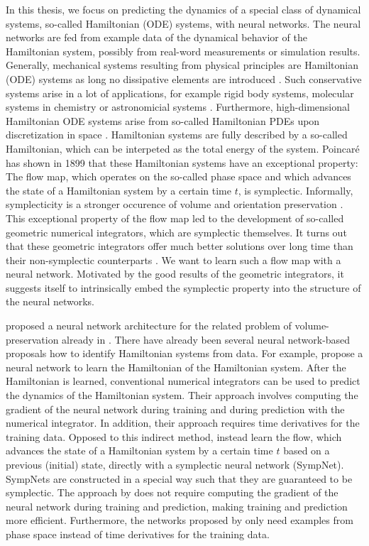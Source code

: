 \documentclass[twoside,a4paper]{article}
\begin{document}
In this thesis, we focus on predicting the dynamics of a special class of dynamical
systems, so-called Hamiltonian (ODE) systems, with neural networks. The neural networks
are fed from example data of the dynamical behavior of the Hamiltonian system,
possibly from real-word measurements or simulation results.
Generally, mechanical systems resulting from physical principles are
Hamiltonian (ODE) systems as long no dissipative elements are introduced 
\cite{leimkuhler_reich_2005}. Such conservative systems arise in a lot
of applications, for example rigid body systems, molecular systems in chemistry or
astronomicial systems \cite{leimkuhler_reich_2005}. Furthermore, high-dimensional
Hamiltonian ODE systems arise from so-called Hamiltonian PDEs upon discretization
in space \cite{leimkuhler_reich_2005}. Hamiltonian systems are fully described
by a so-called Hamiltonian, which can be interpeted as the total energy of the system.
Poincaré has shown in 1899 that these Hamiltonian
systems have an exceptional property: The flow map, which operates on the so-called phase space 
and which advances the state of a Hamiltonian system by a certain time $t$, is symplectic. 
Informally, symplecticity is a stronger occurence of volume and orientation preservation
\cite{leimkuhler_reich_2005}. This exceptional property of the flow map led to the development of 
so-called geometric numerical integrators, which are symplectic themselves. It turns out 
that these geometric integrators offer much better solutions over long time than their
non-symplectic counterparts \cite{hairer2006}. We want to learn such a flow map with 
a neural network. Motivated by the good results of the geometric integrators,
it suggests itself to intrinsically embed the symplectic property into the structure
of the neural networks.

\citet{Deco1995} proposed a neural network architecture for the related
problem of volume-preservation already in \citeyear{Deco1995}. 
There have already been several neural network-based proposals how to identify 
Hamiltonian systems from data.
For example, \citet{Greydanus2019} propose a neural network to learn the Hamiltonian
of the Hamiltonian system. After the Hamiltonian is learned, conventional numerical
integrators can be used to predict the dynamics of the Hamiltonian system.
Their approach involves computing the gradient of the neural network during training
and during prediction with the numerical integrator. In addition, their approach 
requires time derivatives for the training data.
Opposed to this indirect method, \citet{Jin2020} instead learn the flow, 
which advances the state of a Hamiltonian system by a certain time $t$ based on a
previous (initial) state, directly with a symplectic neural network (SympNet). 
SympNets are constructed in a special way such that they are guaranteed to be symplectic.
The approach by \citeauthor{Jin2020} does not require computing the gradient of the neural
network during training and prediction, making training and 
prediction more efficient. Furthermore, the networks proposed by \citeauthor{Jin2020}
only need examples from phase space instead of time derivatives for the training data.
\end{document}

